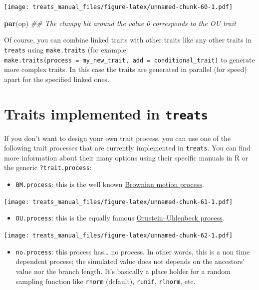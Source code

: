 \documentclass[
]{book}
\newenvironment{Shaded}{\begin{snugshade}}{\end{snugshade}}
\newcommand{\CommentTok}[1]{\textcolor[rgb]{0.56,0.35,0.01}{\textit{#1}}}
\newcommand{\KeywordTok}[1]{\textcolor[rgb]{0.13,0.29,0.53}{\textbf{#1}}}
\newcommand{\NormalTok}[1]{#1}
\providecommand{\tightlist}{%
  \setlength{\itemsep}{0pt}\setlength{\parskip}{0pt}}
\begin{document}
\texttt{[image: treats\_manual\_files/figure-latex/unnamed-chunk-60-1.pdf]}

\begin{Shaded}
\begin{Highlighting}[]
\KeywordTok{par}\NormalTok{(op)}
\CommentTok{\#\# The clumpy bit around the value 0 corresponds to the OU trait}
\end{Highlighting}
\end{Shaded}

Of course, you can combine linked traits with other traits like any other traits in \texttt{treats} using \texttt{make.traits} (for example: \texttt{make.traits(process\ =\ my\_new\_trait,\ add\ =\ conditional\_trait)} to generate more complex traits.
In this case the traits are generated in parallel (for speed) apart for the specified linked ones.

\hypertarget{traits-implemented-in-treats}{%
\section{\texorpdfstring{Traits implemented in \texttt{treats}}{Traits implemented in treats}}\label{traits-implemented-in-treats}}

If you don't want to design your own trait process, you can use one of the following trait processes that are currently implemented in \texttt{treats}. You can find more information about their many options using their specific manuals in R or the generic \texttt{?trait.process}:

\begin{itemize}
\tightlist
\item
  \texttt{BM.process}: this is the well known \href{https://en.wikipedia.org/wiki/Brownian_motion}{Brownian motion process}.
\end{itemize}

\texttt{[image: treats\_manual\_files/figure-latex/unnamed-chunk-61-1.pdf]}

\begin{itemize}
\tightlist
\item
  \texttt{OU.process}: this is the equally famous \href{https://en.wikipedia.org/wiki/Ornstein\%E2\%80\%93Uhlenbeck_process}{Ornstein--Uhlenbeck process}.
\end{itemize}

\texttt{[image: treats\_manual\_files/figure-latex/unnamed-chunk-62-1.pdf]}

\begin{itemize}
\tightlist
\item
  \texttt{no.process}: this process has\ldots{} no process. In other words, this is a non time dependent process; the simulated value does not depends on the ancestors' value nor the branch length. It's basically a place holder for a random sampling function like \texttt{rnorm} (default), \texttt{runif}, \texttt{rlnorm}, etc.
\end{itemize}
\end{document}
